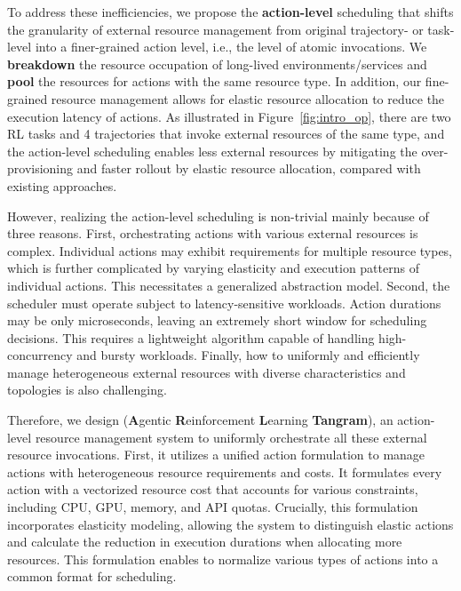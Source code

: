 To address these inefficiencies, we propose the \textbf{action-level} scheduling that shifts the granularity of external resource management from original trajectory- or task-level into a finer-grained action level, i.e., the level of atomic invocations.
We \textbf{breakdown} the resource occupation of long-lived environments/services and \textbf{pool} the resources for actions with the same resource type.
In addition, our fine-grained resource management allows for elastic resource allocation to reduce the execution latency of actions. 
As illustrated in Figure~\ref{fig:intro_op}, there are two RL tasks and 4 trajectories that invoke external resources of the same type, and the action-level scheduling enables less external resources by mitigating the over-provisioning and faster rollout by elastic resource allocation, compared with existing approaches.

However, realizing the action-level scheduling is non-trivial mainly because of three reasons. 
First, orchestrating actions with various external resources is complex.
Individual actions may exhibit requirements for multiple resource types, which is further complicated by varying elasticity and execution patterns of individual actions.
This necessitates a generalized abstraction model.
Second, the scheduler must operate subject to latency-sensitive workloads.
Action durations may be only microseconds, leaving an extremely short window for scheduling decisions.
This requires a lightweight algorithm capable of handling high-concurrency and bursty workloads.
Finally, how to uniformly and efficiently manage heterogeneous external resources with diverse characteristics and topologies is also challenging.

Therefore, we design \sysname (\textbf{A}gentic \textbf{R}einforcement \textbf{L}earning \textbf{Tangram}), an action-level resource management system to uniformly orchestrate all these external resource invocations.
First, it utilizes a unified action formulation to manage actions with heterogeneous resource requirements and costs.
It formulates every action with a vectorized resource cost that accounts for various constraints, including CPU, GPU, memory, and API quotas.
Crucially, this formulation incorporates elasticity modeling, allowing the system to distinguish elastic actions and calculate the reduction in execution durations when allocating more resources.
This formulation enables \sysname to normalize various types of actions into a common format for scheduling.

